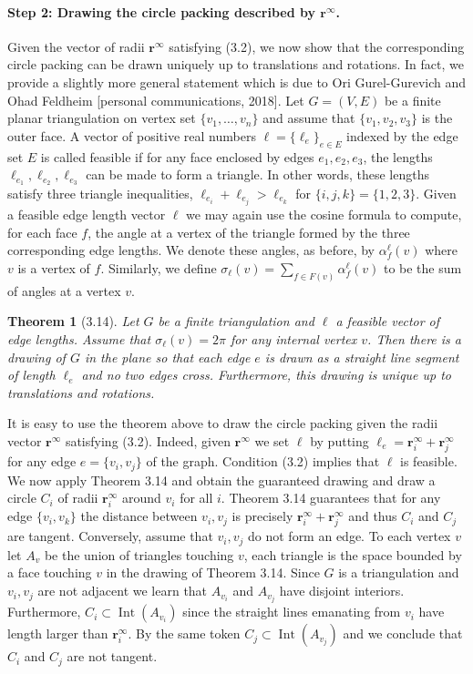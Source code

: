 \documentclass[UTF8,11pt]{ctexart}
\newtheorem*{theorem}{Theorem}
\theoremstyle{definition}
\begin{document}
\paragraph{Step 2: Drawing the circle packing described by $\mathbf r^\infty$.}
Given the vector of radii $\mathbf r^\infty$ satisfying (3.2), we now show that the corresponding circle packing can be drawn uniquely up to translations and rotations. In fact, we provide a slightly more general statement which is due to Ori Gurel-Gurevich and Ohad Feldheim [personal communications, 2018].
Let $G=(V,E)$ be a finite planar triangulation on vertex set $\{v_1,\ldots,v_n\}$ and assume that $\{v_1,v_2,v_3\}$ is the outer face. A vector of positive real numbers $\boldsymbol\ell=\{\ell_e\}_{e\in E}$ indexed by the edge set $E$ is called feasible if for any face enclosed by edges $e_1,e_2,e_3$, the lengths $\ell_{e_1},\ell_{e_2},\ell_{e_3}$ can be made to form a triangle. In other words, these lengths satisfy three triangle inequalities,
$\ell_{e_i}+\ell_{e_j}>\ell_{e_k}$ for $\{i,j,k\}=\{1,2,3\}$.
Given a feasible edge length vector $\boldsymbol\ell$ we may again use the cosine formula to compute, for each face $f$, the angle at a vertex of the triangle formed by the three corresponding edge lengths. We denote these angles, as before, by $\alpha_f^{\boldsymbol\ell}(v)$ where $v$ is a vertex of $f$. Similarly, we define $\sigma_{\boldsymbol\ell}(v)=\sum_{f\in F(v)}\alpha_f^{\boldsymbol\ell}(v)$ to be the sum of angles at a vertex $v$.
\begin{theorem}[3.14]
Let $G$ be a finite triangulation and $\boldsymbol\ell$ a feasible vector of edge lengths. Assume that $\sigma_{\boldsymbol\ell}(v)=2\pi$ for any internal vertex $v$. Then there is a drawing of $G$ in the plane so that each edge $e$ is drawn as a straight line segment of length $\ell_e$ and no two edges cross. Furthermore, this drawing is unique up to translations and rotations.
\end{theorem}
It is easy to use the theorem above to draw the circle packing given the radii vector $\mathbf r^\infty$ satisfying (3.2). Indeed, given $\mathbf r^\infty$ we set $\boldsymbol\ell$ by putting $\ell_e=\mathbf r_i^\infty+\mathbf r_j^\infty$ for any edge $e=\{v_i,v_j\}$ of the graph. Condition (3.2) implies that $\boldsymbol\ell$ is feasible. We now apply Theorem 3.14 and obtain the guaranteed drawing and draw a circle $C_i$ of radii $\mathbf r_i^\infty$ around $v_i$ for all $i$.
Theorem 3.14 guarantees that for any edge $\{v_i,v_k\}$ the distance between $v_i,v_j$ is precisely $\mathbf r_i^\infty+\mathbf r_j^\infty$ and thus $C_i$ and $C_j$ are tangent. Conversely, assume that $v_i,v_j$ do not form an edge. To each vertex $v$ let $A_v$ be the union of triangles touching $v$, each triangle is the space bounded by a face touching $v$ in the drawing of Theorem 3.14. Since $G$ is a triangulation and $v_i,v_j$ are not adjacent we learn that $A_{v_i}$ and $A_{v_j}$ have disjoint interiors. Furthermore, $C_i\subset\operatorname{Int}(A_{v_i})$ since the straight lines emanating from $v_i$ have length larger than $\mathbf r_i^\infty$. By the same token $C_j\subset\operatorname{Int}(A_{v_j})$ and we conclude that $C_i$ and $C_j$ are not tangent.
\end{document}
